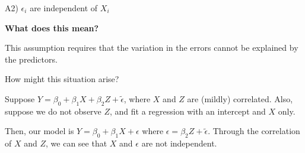 \documentclass[12pt,ignorenonframetext,]{beamer}
\begin{document}
\begin{frame}{A2) \(\epsilon_i\) are independent of \(X_i\)}

\textbf{What does this mean?}

This assumption requires that the variation in the errors cannot be
explained by the predictors.

How might this situation arise?

\pause

Suppose \(Y = \beta_0 + \beta_1X + \beta_2Z + \tilde{\epsilon}\), where
\(X\) and \(Z\) are (mildly) correlated. Also, suppose we do not observe
\(Z\), and fit a regression with an intercept and \(X\) only.

\pause

Then, our model is \(Y = \beta_0 + \beta_1X + \epsilon\) where
\(\epsilon = \beta_2Z + \tilde{\epsilon}\). Through the correlation of
\(X\) and \(Z\), we can see that \(X\) and \(\epsilon\) are not
independent.

\end{frame}
\end{document}
